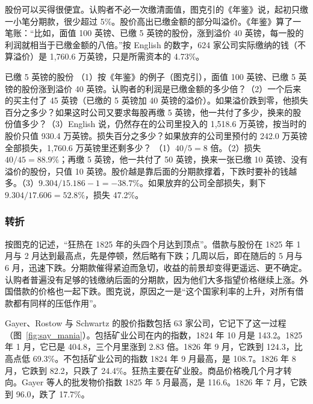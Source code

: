 股份可以买得很便宜。认购者不必一次缴清面值，图克引的《年鉴》说，起初只缴一小笔分期款，很少超过 5\%\cite{tooke1838v2}。股价高出已缴金额的部分叫溢价。《年鉴》算了一笔账：“比如，面值 100 英镑、已缴 5 英镑的股份，涨到溢价 40 英镑，每一股的利润就相当于已缴金额的八倍。”\cite{tooke1838v2}按 English 的数字，624 家公司实际缴纳的钱（不算溢价）是 1,760.6 万英镑，只是所需资本的 4.73\%\cite{english1827}。

\begin{example}{已缴 5 英镑的股份}\label{ex:say-leverage}
（1）按《年鉴》的例子（图克引），面值 100 英镑、已缴 5 英镑的股份涨到溢价 40 英镑。认购者的利润是已缴金额的多少倍？（2）一个后来的买主付了 45 英镑（已缴的 5 英镑加 40 英镑的溢价）。如果溢价跌到零，他损失百分之多少？如果这时公司又要求每股再缴 5 英镑，他一共付了多少，换来的股份值多少？（3）English 说，仍然存在的公司里投入的 1,518.6 万英镑，按当时的股价只值 930.4 万英镑。损失百分之多少？如果放弃的公司里预付的 242.0 万英镑全部损失，1,760.6 万英镑里还剩多少？
\solution （1）$40/5=8$ 倍。（2）损失 $40/45=88.9\%$；再缴 5 英镑，他一共付了 50 英镑，换来一张已缴 10 英镑、没有溢价的股份，只值 10 英镑。股价越是靠后面的分期款撑着，下跌时要补的钱越多。（3）$9.304/15.186-1=-38.7\%$。如果放弃的公司全部损失，剩下 $9.304/17.606=52.8\%$，损失 47.2\%。
\end{example}

\subsubsection{转折}
按图克的记述，“狂热在 1825 年的头四个月达到顶点”。借款与股份在 1825 年 1 月与 2 月达到最高点，先是停顿，然后略有下跌；几周以后，即在随后的 5 月与 6 月，迅速下跌\cite{tooke1838v2}。分期款催得紧迫而急切，收益的前景却变得更遥远、更不确定\cite{tooke1838v2}。认购者普遍没有足够的钱缴纳后面的分期款，因为他们大多指望价格继续上涨\cite{tooke1838v2}。外国借款的价格也一起下跌。图克说，原因之一是“这个国家利率的上升，对所有借款都有同样的压低作用”\cite{tooke1838v2}。

Gayer、Rostow 与 Schwartz 的股价指数包括 63 家公司，它记下了这一过程（图~\ref{fig:say_mania}）。包括矿业公司在内的指数，1824 年 10 月是 143.2。1825 年 1 月，它已是 404.8，三个月里涨到 2.83 倍。1826 年 9 月，它跌到 124.3，比高点低 69.3\%\cite{gayer1953,boe2017}。不包括矿业公司的指数 1824 年 9 月最高，是 108.7。1826 年 8 月，它跌到 82.2，只跌了 24.4\%。狂热主要在矿业股。商品价格晚几个月才转向。Gayer 等人的批发物价指数 1825 年 5 月最高，是 116.6。1826 年 7 月，它跌到 96.0，跌了 17.7\%\cite{gayer1953,boe2017}。

